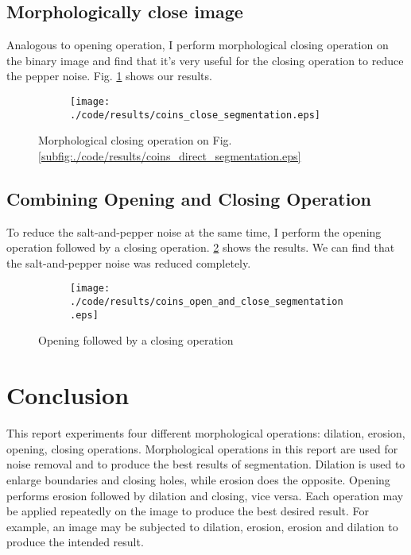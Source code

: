 \documentclass[journal,comsoc]{IEEEtran}
\begin{document}
\subsection{Morphologically close image}

Analogous to opening operation, I perform morphological closing operation on the binary image
and find that it's very useful for the closing operation to reduce the pepper noise.
Fig. \ref{subfig:./code/results/coins_close_segmentation.eps} shows our results.

\begin{figure}[h]
  \centering
  \begin{subfigure}[t]{.5\textwidth}
    \centering
    \texttt{[image: ./code/results/coins\_close\_segmentation.eps]}
  \end{subfigure}
  \caption{Morphological closing operation on Fig. \ref{subfig:./code/results/coins_direct_segmentation.eps}}
  \label{subfig:./code/results/coins_close_segmentation.eps}
\end{figure}

\subsection{Combining Opening and Closing Operation}

To reduce the salt-and-pepper noise at the same time, I perform the opening operation followed
by a closing operation. \ref{subfig:./code/results/coins_open_and_close_segmentation.eps} shows
the results. We can find that the salt-and-pepper noise was reduced completely.

\begin{figure}[!htb]
  \centering
  \begin{subfigure}[t]{.5\textwidth}
    \centering
    \texttt{[image: ./code/results/coins\_open\_and\_close\_segmentation.eps]}
  \end{subfigure}
  \caption{Opening followed by a closing operation}
  \label{subfig:./code/results/coins_open_and_close_segmentation.eps}
\end{figure}


\section{Conclusion}

This report experiments four different morphological operations: dilation, erosion, opening, closing operations.
Morphological operations in this report are used for noise removal and to produce the best results of segmentation.
Dilation is used to enlarge boundaries and closing holes, while erosion does the opposite. Opening performs erosion
followed by dilation and closing, vice versa. Each operation may be applied repeatedly on the image to produce the
best desired result. For example, an image may be subjected to dilation, erosion, erosion and dilation to produce the intended result.
\end{document}
